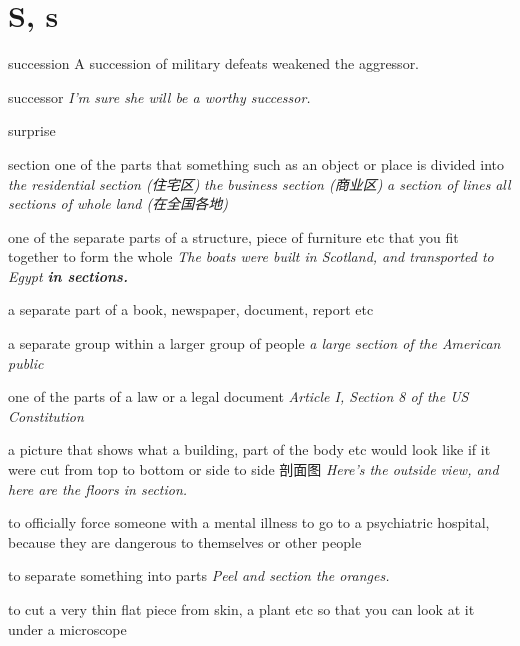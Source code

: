 \section{S, s}

\begin{word}{succession}
    A succession of military defeats weakened the aggressor.
\end{word}

\begin{word}{successor}
    \textit{I'm sure she will be a worthy successor.}
\end{word}

\begin{word}{surprise}
\end{word}

\begin{word}{section}
    one of the parts that something such as an object or place is divided into
    \textit{the residential section (住宅区)}
    \textit{the business section (商业区)}
    \textit{a section of lines}
    \textit{all sections of whole land (在全国各地)}

    one of the separate parts of a structure, piece of furniture etc that you fit together to form the whole
    \textit{The boats were built in Scotland, and transported to Egypt \textbf{in sections.}}

    a separate part of a book, newspaper, document, report etc

    a separate group within a larger group of people
    \textit{a large section of the American public}

    one of the parts of a law or a legal document
    \textit{Article I, Section 8 of the US Constitution}

    a picture that shows what a building, part of the body etc would look like if it were cut from top to bottom or side to side 剖面图
    \textit{Here's the outside view, and here are the floors in section.}

    to officially force someone with a mental illness to go to a psychiatric hospital, because they are dangerous to themselves or other people

    to separate something into parts
    \textit{Peel and section the oranges.}

    to cut a very thin flat piece from skin, a plant etc so that you can look at it under a microscope
\end{word}

